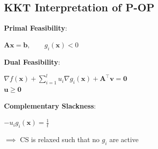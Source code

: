 \documentclass[english]{latex4ei/latex4ei_sheet}
\begin{document}
\begin{sectionbox}
	\subsection{KKT Interpretation of P-OP}
	
	\textbf{Primal Feasibility}: \\
	\begin{center}
		$\bm{A}\bm{x} = \bm{b}, \qquad g_i(\bm{x}) < 0$
	\end{center}
	\vspace{0.5em}
	
	\textbf{Dual Feasibility}: \\
	\begin{center}
		$\nabla f(\bm{x}) + \sum\limits_{i=1}^{l} u_i \nabla g_i(\bm{x}) + \bm{A}^\intercal\bm{v} = \bm{0}$ \\
		$\bm{u} \geq \bm{0}$
	\end{center}
	\vspace{0.5em}
	
	\textbf{Complementary Slackness}: \\
	\begin{center}
		$ -u_i g_i(\bm{x}) = \frac{1}{t} $
	\end{center}

	$\implies$ CS is relaxed such that no $g_i$ are active
	
\end{sectionbox}
\end{document}
